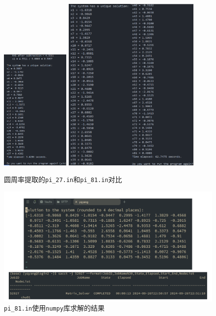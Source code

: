 \begin{figure}[H]
	\centering
	\includegraphics[width=0.3\textwidth]{Problem_2/figs/pi_27.png}
	\vspace{5pt}
	\includegraphics[width=0.6\textwidth]{Problem_2/figs/pi_81.pdf}
	\caption{圆周率提取的\texttt{pi\_27.in}和\texttt{pi\_81.in}对比}
\end{figure}

\begin{figure}[H]
	\centering
	\includegraphics[width=1.0\textwidth]{Problem_2/figs/slurm.pdf}
	\caption{\texttt{pi\_81.in}使用\texttt{numpy}库求解的结果}
\end{figure}